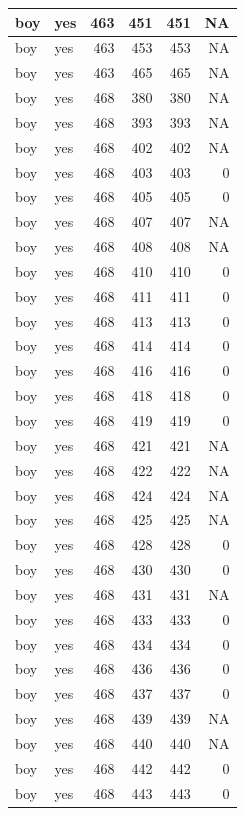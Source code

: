 \documentclass[man]{apa6}
\begin{document}
\begin{tabular}{l|l|r|r|r|r}
\hline
boy & yes & 463 & 451 & 451 & NA\\
\hline
boy & yes & 463 & 453 & 453 & NA\\
\hline
boy & yes & 463 & 465 & 465 & NA\\
\hline
boy & yes & 468 & 380 & 380 & NA\\
\hline
boy & yes & 468 & 393 & 393 & NA\\
\hline
boy & yes & 468 & 402 & 402 & NA\\
\hline
boy & yes & 468 & 403 & 403 & 0\\
\hline
boy & yes & 468 & 405 & 405 & 0\\
\hline
boy & yes & 468 & 407 & 407 & NA\\
\hline
boy & yes & 468 & 408 & 408 & NA\\
\hline
boy & yes & 468 & 410 & 410 & 0\\
\hline
boy & yes & 468 & 411 & 411 & 0\\
\hline
boy & yes & 468 & 413 & 413 & 0\\
\hline
boy & yes & 468 & 414 & 414 & 0\\
\hline
boy & yes & 468 & 416 & 416 & 0\\
\hline
boy & yes & 468 & 418 & 418 & 0\\
\hline
boy & yes & 468 & 419 & 419 & 0\\
\hline
boy & yes & 468 & 421 & 421 & NA\\
\hline
boy & yes & 468 & 422 & 422 & NA\\
\hline
boy & yes & 468 & 424 & 424 & NA\\
\hline
boy & yes & 468 & 425 & 425 & NA\\
\hline
boy & yes & 468 & 428 & 428 & 0\\
\hline
boy & yes & 468 & 430 & 430 & 0\\
\hline
boy & yes & 468 & 431 & 431 & NA\\
\hline
boy & yes & 468 & 433 & 433 & 0\\
\hline
boy & yes & 468 & 434 & 434 & 0\\
\hline
boy & yes & 468 & 436 & 436 & 0\\
\hline
boy & yes & 468 & 437 & 437 & 0\\
\hline
boy & yes & 468 & 439 & 439 & NA\\
\hline
boy & yes & 468 & 440 & 440 & NA\\
\hline
boy & yes & 468 & 442 & 442 & 0\\
\hline
boy & yes & 468 & 443 & 443 & 0\\

\end{tabular}
\end{document}
